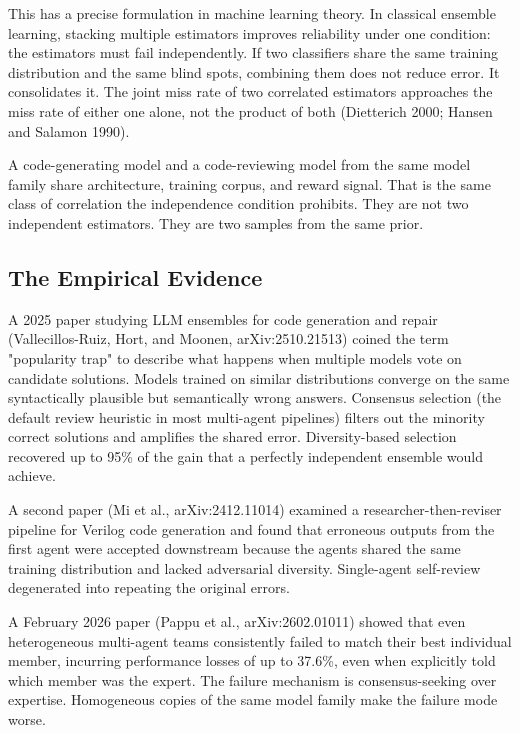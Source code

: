 \documentclass{article}
\begin{document}
This has a precise formulation in machine learning theory. In classical
ensemble learning, stacking multiple estimators improves reliability under
one condition: the estimators must fail independently. If two classifiers
share the same training distribution and the same blind spots, combining
them does not reduce error. It consolidates it. The joint miss rate of two
correlated estimators approaches the miss rate of either one alone, not
the product of both (Dietterich 2000; Hansen and Salamon 1990).

A code-generating model and a code-reviewing model from the same model
family share architecture, training corpus, and reward signal. That is
the same class of correlation the independence condition prohibits. They
are not two independent estimators. They are two samples from the same
prior.

\subsection{The Empirical Evidence}

A 2025 paper studying LLM ensembles for code generation and repair
(Vallecillos-Ruiz, Hort, and Moonen, arXiv:2510.21513) coined the term
"popularity trap" to describe what happens when multiple models vote on
candidate solutions. Models trained on similar distributions converge on
the same syntactically plausible but semantically wrong answers. Consensus
selection (the default review heuristic in most multi-agent pipelines)
filters out the minority correct solutions and amplifies the shared
error. Diversity-based selection recovered up to 95\% of the gain that a
perfectly independent ensemble would achieve.

A second paper (Mi et al., arXiv:2412.11014) examined a
researcher-then-reviser pipeline for Verilog code generation and found
that erroneous outputs from the first agent were accepted downstream
because the agents shared the same training distribution and lacked
adversarial diversity. Single-agent self-review degenerated into
repeating the original errors.

A February 2026 paper (Pappu et al., arXiv:2602.01011) showed that even
heterogeneous multi-agent teams consistently failed to match their best
individual member, incurring performance losses of up to 37.6\%, even when
explicitly told which member was the expert. The failure mechanism is
consensus-seeking over expertise. Homogeneous copies of the same model
family make the failure mode worse.
\end{document}
